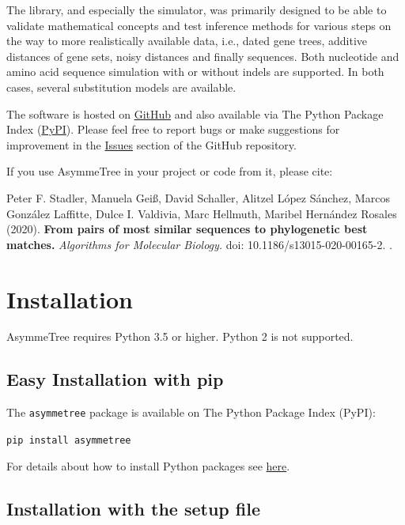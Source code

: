 \documentclass[hidelinks,11pt]{article}
\newcommand{\COMMANDLINE}[1]{\begingroup\par\vspace{3mm}\color{darkgrey}\begin{adjustwidth}{1cm}{1cm}\texttt{#1}\end{adjustwidth}\vspace{3mm}\endgroup}
\begin{document}
The library, and especially the simulator, was primarily designed to be able to validate mathematical concepts and test inference methods for various steps on the way to more realistically available data, i.e., dated gene trees, additive distances of gene sets, noisy distances and finally sequences.
Both nucleotide and amino acid sequence simulation with or without indels are supported. In both cases, several substitution models are available.

The software is hosted on \href{https://github.com/david-schaller/AsymmeTree}{GitHub} and also available via The Python Package Index (\href{https://pypi.org/project/asymmetree/}{PyPI}).
Please feel free to report bugs or make suggestions for improvement in the \href{https://github.com/david-schaller/AsymmeTree/issues}{Issues} section of the GitHub repository.

If you use AsymmeTree in your project or code from it, please cite:

\vspace{3mm}
\begin{adjustwidth}{1cm}{1cm}
	Peter F. Stadler, Manuela Gei{\ss}, David Schaller, Alitzel L{\'o}pez S{\'a}nchez, Marcos Gonz{\'a}lez Laffitte, Dulce I. Valdivia, Marc Hellmuth, Maribel Hern{\'a}ndez Rosales (2020). \textbf{From pairs of most similar sequences to phylogenetic best matches.} \textit{Algorithms for Molecular Biology.} doi: 10.1186/s13015-020-00165-2. \citep{stadler2020}.
\end{adjustwidth}
\vspace{3mm}


\section{Installation}

AsymmeTree requires Python 3.5 or higher. Python 2 is not supported.

\subsection{Easy Installation with pip}


The \texttt{asymmetree} package is available on The Python Package Index (PyPI):

\COMMANDLINE{pip install asymmetree}

\noindent
For details about how to install Python packages see
\href{https://packaging.python.org/tutorials/installing-packages/}{here}.

\subsection{Installation with the setup file}
\end{document}
